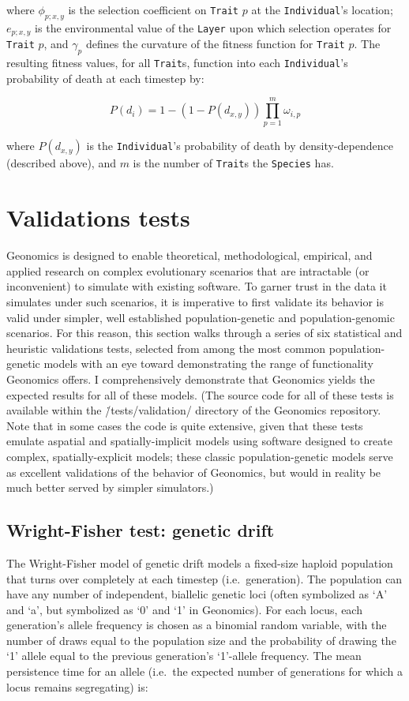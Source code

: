 ﻿\documentclass{article}
\begin{document}
where $\phi_{p;x,y}$ is the selection coefficient on \texttt{Trait} $p$ at the
\texttt{Individual}'s location; $e_{p;x,y}$ is the environmental value
of the \texttt{Layer} upon which selection operates for \texttt{Trait} $p$,
and $\gamma_{p}$ defines the curvature of the fitness function for \texttt{Trait} $p$.
The resulting fitness values, for all \texttt{Trait}s, function into each
\texttt{Individual}'s probability of death at each timestep by:

\begin{equation}
P(d_{i}) = 1 - (1 - P(d_{x,y})) \prod_{p = 1}^{m}\omega_{i,p}
\end{equation}

where $P(d_{x,y})$ is the \texttt{Individual}'s probability of death by
density-dependence (described above), and $m$ is the number of \texttt{Trait}s
the \texttt{Species} has.


\section{Validations tests}
Geonomics is designed to enable theoretical, methodological, empirical, and applied
research on complex evolutionary scenarios that are intractable (or inconvenient)
to simulate with existing software.
To garner trust in the data it simulates under such scenarios, 
it is imperative to first validate its behavior is valid under simpler,
well established population-genetic and population-genomic scenarios.
For this reason, this section walks through a series of six statistical
and heuristic validations tests, selected from among the most
common population-genetic models with an eye toward demonstrating the range
of functionality Geonomics offers.
I comprehensively demonstrate that Geonomics yields the expected results
for all of these models.
(The source code for all of these tests is available within the
\./tests/validation/ directory of the Geonomics repository.
Note that in some cases the code is quite extensive, given that these tests
emulate aspatial and spatially-implicit models using software designed to
create complex, spatially-explicit models; these classic population-genetic models
serve as excellent validations of the behavior of Geonomics,
but would in reality be much better served by simpler simulators.)


\subsection{Wright-Fisher test: genetic drift}
The Wright-Fisher model of genetic drift models a fixed-size haploid population that
turns over completely at each timestep (i.e.\ generation). The population can have
any number of independent, biallelic genetic loci (often symbolized as ‘A’ and ‘a’,
but symbolized as ‘0’ and ‘1’ in Geonomics). For each locus, each generation’s allele
frequency is chosen as a binomial random variable, with the number of draws equal to
the population size and the probability of drawing the ‘1’ allele equal to the previous 
generation’s ‘1’-allele frequency. The mean persistence time for an allele 
(i.e.\ the expected number of generations for which a locus remains segregating) 
is:
\end{document}
